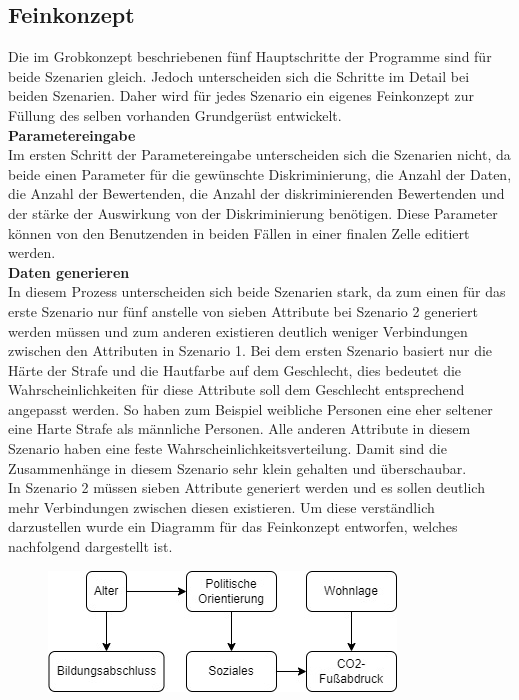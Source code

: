 \begin{onehalfspace}
\subsection{Feinkonzept}
\label{subsubsec:feinkonzept}
Die im Grobkonzept beschriebenen fünf Hauptschritte der Programme sind für beide Szenarien gleich. Jedoch unterscheiden sich die Schritte im Detail bei beiden Szenarien. Daher wird für jedes Szenario ein eigenes Feinkonzept zur Füllung des selben vorhanden Grundgerüst entwickelt.\\
\textbf{Parametereingabe}\\
Im ersten Schritt der Parametereingabe unterscheiden sich die Szenarien nicht, da beide einen Parameter für die gewünschte Diskriminierung, die Anzahl der Daten, die Anzahl der Bewertenden, die Anzahl der diskriminierenden Bewertenden und der stärke der Auswirkung von der Diskriminierung benötigen. Diese Parameter können von den Benutzenden in beiden Fällen in einer finalen Zelle editiert werden.\\
\textbf{Daten generieren}\\
In diesem Prozess unterscheiden sich beide Szenarien stark, da zum einen für das erste Szenario nur fünf anstelle von sieben Attribute bei Szenario 2 generiert werden müssen und zum anderen existieren deutlich weniger Verbindungen zwischen den Attributen in Szenario 1. Bei dem ersten Szenario basiert nur die Härte der Strafe und die Hautfarbe auf dem Geschlecht, dies bedeutet die Wahrscheinlichkeiten für diese Attribute soll dem Geschlecht entsprechend angepasst werden. So haben zum Beispiel weibliche Personen eine eher seltener eine Harte Strafe als männliche Personen. Alle anderen Attribute in diesem Szenario haben eine feste Wahrscheinlichkeitsverteilung. Damit sind die Zusammenhänge in diesem Szenario sehr klein gehalten und überschaubar.\\
In Szenario 2 müssen sieben Attribute generiert werden und es sollen deutlich mehr Verbindungen zwischen diesen existieren. Um diese verständlich darzustellen wurde ein Diagramm für das Feinkonzept entworfen, welches nachfolgend dargestellt ist.\\
\begin{figure}[h]
    \centering
    \includegraphics{Diagramme/Verbindung_der_Attribute_S2.jpg}

\end{figure}
\end{onehalfspace}
